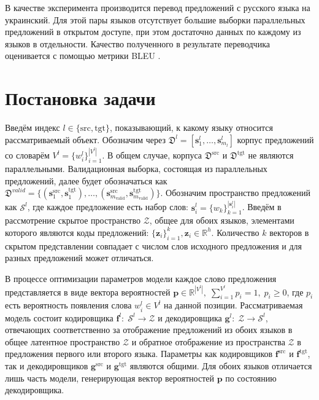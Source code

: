 \documentclass[12pt,twoside]{article}
\begin{document}
В качестве эксперимента производится перевод предложений с русского языка на украинский. Для этой пары языков отсутствует большие выборки параллельных предложений в открытом доступе, при этом достаточно данных по каждому из языков в отдельности. Качество полученного в результате переводчика оценивается с помощью метрики BLEU \cite{papineni2002bleu}. 

\section{Постановка задачи}

Введём индекс $l \in \{\text{src}, \text{tgt}\}$, показывающий, к какому языку относится рассматриваемый объект. Обозначим через $\mathfrak{D}^{l} = [\mathbf{s}_1^{l}, \dots, \mathbf{s}_{m_l}^{l}]$ корпус предложений со словарём $V^{l} = \{w_i^{l}\}_{i=1}^{|V^{l}|}$. В общем случае, корпуса $\mathfrak{D}^{\text{src}}$ и $\mathfrak{D}^{\text{tgt}}$ не являются параллельными. Валидационная выборка, состоящая из параллельных предложений, далее будет обозначаться как $\mathfrak{D}^{valid} = \{(\mathbf{s}_1^{\text{src}}, \mathbf{s}_1^{\text{tgt}}), \dots, (\mathbf{s}_{m_\text{valid}}^{\text{src}}, \mathbf{s}_{m_\text{valid}}^{\text{tgt}})\}$. Обозначим пространство предложений как $\mathcal{S}^{l}$, где каждое предложение есть набор слов: $\mathbf{s}_i^{l} = \{w_k\}_{k=1}^{|\mathbf{s}_i^{l}|}$. Введём в рассмотрение скрытое пространство $\mathcal{Z}$, общее для обоих языков, элементами которого являются коды предложений: $\{\mathbf{z}_i\}_{i=1}^k, \mathbf{z}_i \in \mathbb{R}^h$. Количество $k$ векторов в скрытом представлении совпадает с числом слов исходного предложения и для разных предложений может отличаться. 

В процессе оптимизации параметров модели каждое слово предложения представляется в виде вектора вероятностей $\mathbf{p} \in \mathbb{R}^{|V^{l}|}, \; \sum_{i=1}^{V^{l}} p_i = 1, \; p_i \ge 0$, где $p_i$ есть вероятность появления слова $w_i^{l} \in V^{l}$ на данной позиции. Рассматриваемая модель состоит кодировщика $\mathbf{f}^{l}: \; \mathcal{S}^l \to \mathcal{Z}$ и декодировщика $\mathbf{g}^l: \; \mathcal{Z} \to \mathcal{S}^l$, отвечающих соответственно за отображение предложений из обоих языков в общее латентное пространство $\mathcal{Z}$ и обратное отображение из пространства $\mathcal{Z}$ в предложения первого или второго языка. Параметры как кодировщиков $\mathbf{f}^{\text{src}}$ и $\mathbf{f}^{\text{tgt}}$, так и декодировщиков $\mathbf{g}^{\text{src}}$ и $\mathbf{g}^{\text{tgt}}$ являются общими. Для обоих языков отличается лишь часть модели, генерирующая вектор вероятностей $\mathbf{p}$ по состоянию декодировщика.
\end{document}
